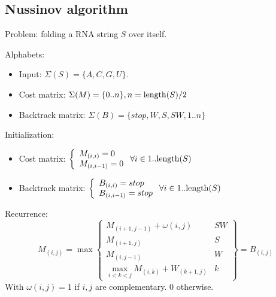 \documentclass[11pt]{article}
\def\ul{\begin{itemize}}
\def\ule{\end{itemize}}
\begin{document}
\newpage
\subsection{Nussinov algorithm}
Problem: folding a RNA string $S$ over itself.

Alphabets:\ul
\item Input: $\Sigma(S)=\{A,C,G,U\}$.
\item Cost matrix: $\Sigma(M)=\{0..n\}, n={\rm length}(S)/2$
\item Backtrack matrix: $\Sigma(B)=\{stop,W,S,SW, 1..n\}$
\ule

Initialization: \ul
\item Cost matrix: $\left\{\begin{array}{l} M_{(i,i)}=0 \\ M_{(i,i-1)}=0 \end{array}\right. \forall i \in 1..{\rm length}(S)$
\item Backtrack matrix: $\left\{\begin{array}{l} B_{(i,i)}=stop \\ B_{(i,i-1)}=stop \end{array}\right.  \forall i \in 1..{\rm length}(S)$
\ule

Recurrence:
\[M_{(i,j)}=\max\left\{\begin{array}{l|l}
	M_{(i+1,j-1)}+\omega(i,j) & SW\\
	M_{(i+1,j)} & S\\
	M_{(i,j-1)} & W\\
	\max_{i<k<j}M_{(i,k)}+W_{(k+1,j)} & k
\end{array}\right\} = B_{(i,j)} \]
With $\omega(i,j)=1$ if $i,j$ are complementary. 0 otherwise.
\end{document}
